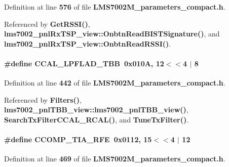 Definition at line {\bf 576} of file {\bf L\+M\+S7002\+M\+\_\+parameters\+\_\+compact.\+h}.



Referenced by {\bf Get\+R\+S\+S\+I()}, {\bf lms7002\+\_\+pnl\+Rx\+T\+S\+P\+\_\+view\+::\+Onbtn\+Read\+B\+I\+S\+T\+Signature()}, and {\bf lms7002\+\_\+pnl\+Rx\+T\+S\+P\+\_\+view\+::\+Onbtn\+Read\+R\+S\+S\+I()}.

\paragraph[{C\+C\+A\+L\+\_\+\+L\+P\+F\+L\+A\+D\+\_\+\+T\+BB}]{\setlength{\rightskip}{0pt plus 5cm}\#define C\+C\+A\+L\+\_\+\+L\+P\+F\+L\+A\+D\+\_\+\+T\+BB~0x010\+A, 12$<$$<$4 $\vert$  8}\label{LMS7002M__parameters__compact_8h_a1d8189f049644f665952157a65fd3fd2}


Definition at line {\bf 442} of file {\bf L\+M\+S7002\+M\+\_\+parameters\+\_\+compact.\+h}.



Referenced by {\bf Filters()}, {\bf lms7002\+\_\+pnl\+T\+B\+B\+\_\+view\+::lms7002\+\_\+pnl\+T\+B\+B\+\_\+view()}, {\bf Search\+Tx\+Filter\+C\+C\+A\+L\+\_\+\+R\+C\+A\+L()}, and {\bf Tune\+Tx\+Filter()}.

\paragraph[{C\+C\+O\+M\+P\+\_\+\+T\+I\+A\+\_\+\+R\+FE}]{\setlength{\rightskip}{0pt plus 5cm}\#define C\+C\+O\+M\+P\+\_\+\+T\+I\+A\+\_\+\+R\+FE~0x0112, 15$<$$<$4 $\vert$  12}\label{LMS7002M__parameters__compact_8h_a1651e86e6eca2e2ea939cbf06d10c940}


Definition at line {\bf 469} of file {\bf L\+M\+S7002\+M\+\_\+parameters\+\_\+compact.\+h}.



